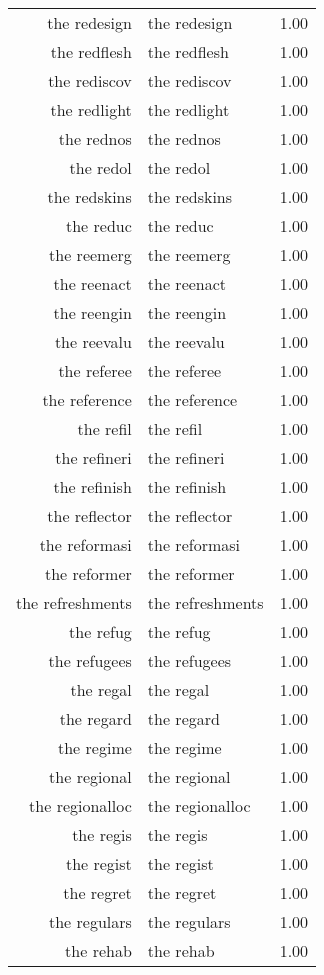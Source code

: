 \begin{table}[ht]
\begin{tabular}{rlr}
  the redesign & the redesign & 1.00 \\ 
  the redflesh & the redflesh & 1.00 \\ 
  the rediscov & the rediscov & 1.00 \\ 
  the redlight & the redlight & 1.00 \\ 
  the rednos & the rednos & 1.00 \\ 
  the redol & the redol & 1.00 \\ 
  the redskins & the redskins & 1.00 \\ 
  the reduc & the reduc & 1.00 \\ 
  the reemerg & the reemerg & 1.00 \\ 
  the reenact & the reenact & 1.00 \\ 
  the reengin & the reengin & 1.00 \\ 
  the reevalu & the reevalu & 1.00 \\ 
  the referee & the referee & 1.00 \\ 
  the reference & the reference & 1.00 \\ 
  the refil & the refil & 1.00 \\ 
  the refineri & the refineri & 1.00 \\ 
  the refinish & the refinish & 1.00 \\ 
  the reflector & the reflector & 1.00 \\ 
  the reformasi & the reformasi & 1.00 \\ 
  the reformer & the reformer & 1.00 \\ 
  the refreshments & the refreshments & 1.00 \\ 
  the refug & the refug & 1.00 \\ 
  the refugees & the refugees & 1.00 \\ 
  the regal & the regal & 1.00 \\ 
  the regard & the regard & 1.00 \\ 
  the regime & the regime & 1.00 \\ 
  the regional & the regional & 1.00 \\ 
  the regionalloc & the regionalloc & 1.00 \\ 
  the regis & the regis & 1.00 \\ 
  the regist & the regist & 1.00 \\ 
  the regret & the regret & 1.00 \\ 
  the regulars & the regulars & 1.00 \\ 
  the rehab & the rehab & 1.00 \\ 

\end{tabular}
\end{table}
